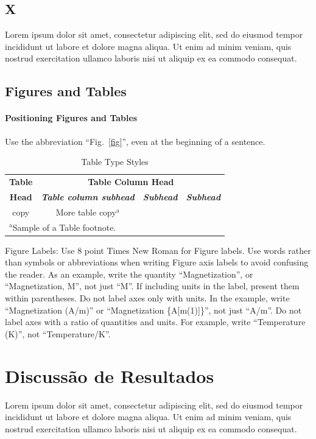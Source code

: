 \documentclass[conference]{IEEEtran}
\begin{document}
\subsection{X}
Lorem ipsum dolor sit amet, consectetur adipiscing elit, sed do eiusmod tempor incididunt ut labore et dolore magna aliqua. Ut enim ad minim veniam, quis nostrud exercitation ullamco laboris nisi ut aliquip ex ea commodo consequat.

\subsection{Figures and Tables}
\paragraph{Positioning Figures and Tables} 
Use the abbreviation 
``Fig.~\ref{fig}'', even at the beginning of a sentence.

\begin{table}[htbp]
\caption{Table Type Styles}
\begin{center}
\begin{tabular}{|c|c|c|c|}
\hline
\textbf{Table}&\multicolumn{3}{|c|}{\textbf{Table Column Head}} \\
\cline{2-4} 
\textbf{Head} & \textbf{\textit{Table column subhead}}& \textbf{\textit{Subhead}}& \textbf{\textit{Subhead}} \\
\hline
copy& More table copy$^{\mathrm{a}}$& &  \\
\hline
\multicolumn{4}{l}{$^{\mathrm{a}}$Sample of a Table footnote.}
\end{tabular}
\label{tab1}
\end{center}
\end{table}

Figure Labels: Use 8 point Times New Roman for Figure labels. Use words 
rather than symbols or abbreviations when writing Figure axis labels to 
avoid confusing the reader. As an example, write the quantity 
``Magnetization'', or ``Magnetization, M'', not just ``M''. If including 
units in the label, present them within parentheses. Do not label axes only 
with units. In the example, write ``Magnetization (A/m)'' or ``Magnetization 
\{A[m(1)]\}'', not just ``A/m''. Do not label axes with a ratio of 
quantities and units. For example, write ``Temperature (K)'', not 
``Temperature/K''.

\section{Discussão de Resultados} %
Lorem ipsum dolor sit amet, consectetur adipiscing elit, sed do eiusmod tempor incididunt ut labore et dolore magna aliqua. Ut enim ad minim veniam, quis nostrud exercitation ullamco laboris nisi ut aliquip ex ea commodo consequat.
\end{document}
